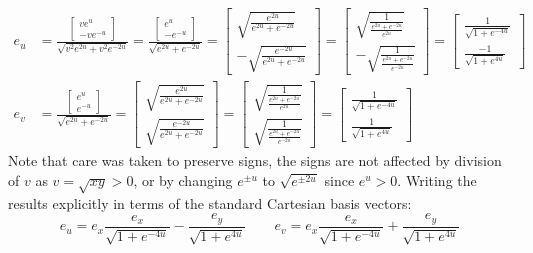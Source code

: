 \documentclass[a4paper, 11pt]{article}
\begin{document}
\begin{enumerate}[label=(\alph*)]
        \begin{align*}
          e_u & = \frac{
          \begin{bmatrix}
            ve^u \\
            -ve^{-u}
          \end{bmatrix}
          }{
          \sqrt{v^2e^{2u} + v^2e^{-2u}}
          }
          = \frac{
            \begin{bmatrix}
              e^u \\
              -e^{-u}
            \end{bmatrix}}{
            \sqrt{e^{2u} + e^{-2u}}
          }
          = \begin{bmatrix}
              \sqrt{\frac{e^{2u}}{e^{2u} + e^{-2u}}} \\
              -\sqrt{\frac{e^{-2u}}{e^{2u} + e^{-2u}}}
            \end{bmatrix}
          = \begin{bmatrix}
              \sqrt{\frac{1}{\frac{e^{2u} + e^{-2u}}{e^{2u}}}} \\
              -\sqrt{\frac{1}{\frac{e^{2u} + e^{-2u}}{e^{-2u}}}}
            \end{bmatrix}
          = \begin{bmatrix}
              \frac{1}{\sqrt{1 + e^{-4u}}} \\
              \frac{-1}{\sqrt{1 + e^{4u}}}
            \end{bmatrix} \\
          e_v & = \frac{
          \begin{bmatrix}
            e^u \\
            e^{-u}
          \end{bmatrix}}{
          \sqrt{e^{2u}+e^{-2u}}
          }
          = \begin{bmatrix}
              \sqrt{\frac{e^{2u}}{e^{2u} + e^{-2u}}} \\
              \sqrt{\frac{e^{-2u}}{e^{2u} + e^{-2u}}}
            \end{bmatrix}
          = \begin{bmatrix}
              \sqrt{\frac{1}{\frac{e^{2u} + e^{-2u}}{e^{2u}}}} \\
              \sqrt{\frac{1}{\frac{e^{2u} + e^{-2u}}{e^{-2u}}}}
            \end{bmatrix}
          = \begin{bmatrix}
              \frac{1}{\sqrt{1 + e^{-4u}}} \\
              \frac{1}{\sqrt{1 + e^{4u}}}
            \end{bmatrix}
        \end{align*}
        Note that care was taken to preserve signs, the signs are not affected by division of $v$ as $v=\sqrt{xy}>0$, or by changing $e^{\pm u}$ to $\sqrt{e^{\pm2u}}$ since $e^u>0$. Writing the results explicitly in terms of the standard Cartesian basis vectors:
        \[e_u = e_x\frac{e_x}{\sqrt{1 + e^{-4u}}}
          -\frac{e_y}{\sqrt{1 + e^{4u}}}\qquad e_v= e_x\frac{e_x}{\sqrt{1 + e^{-4u}}}
          +\frac{e_y}{\sqrt{1 + e^{4u}}}
        \]


\end{enumerate}
\end{document}
